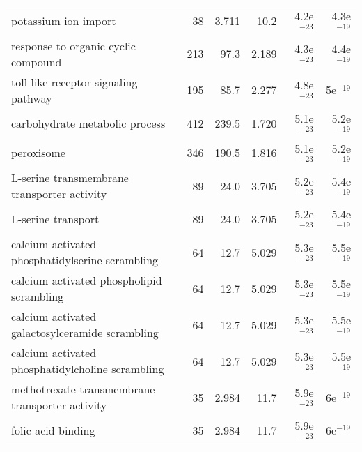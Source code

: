 \begin{longtable}{lrrrrr}
                              potassium ion import &                      38 &                   3.711 &       10.2 &         4.2e$^{-23}$ &         4.3e$^{-19}$ \\
               response to organic cyclic compound &                     213 &                    97.3 &      2.189 &         4.3e$^{-23}$ &         4.4e$^{-19}$ \\
              toll-like receptor signaling pathway &                     195 &                    85.7 &      2.277 &         4.8e$^{-23}$ &           5e$^{-19}$ \\
                    carbohydrate metabolic process &                     412 &                   239.5 &      1.720 &         5.1e$^{-23}$ &         5.2e$^{-19}$ \\
                                        peroxisome &                     346 &                   190.5 &      1.816 &         5.1e$^{-23}$ &         5.2e$^{-19}$ \\
       L-serine transmembrane transporter activity &                      89 &                    24.0 &      3.705 &         5.2e$^{-23}$ &         5.4e$^{-19}$ \\
                                L-serine transport &                      89 &                    24.0 &      3.705 &         5.2e$^{-23}$ &         5.4e$^{-19}$ \\
   calcium activated phosphatidylserine scrambling &                      64 &                    12.7 &      5.029 &         5.3e$^{-23}$ &         5.5e$^{-19}$ \\
         calcium activated phospholipid scrambling &                      64 &                    12.7 &      5.029 &         5.3e$^{-23}$ &         5.5e$^{-19}$ \\
   calcium activated galactosylceramide scrambling &                      64 &                    12.7 &      5.029 &         5.3e$^{-23}$ &         5.5e$^{-19}$ \\
  calcium activated phosphatidylcholine scrambling &                      64 &                    12.7 &      5.029 &         5.3e$^{-23}$ &         5.5e$^{-19}$ \\
   methotrexate transmembrane transporter activity &                      35 &                   2.984 &       11.7 &         5.9e$^{-23}$ &           6e$^{-19}$ \\
                                folic acid binding &                      35 &                   2.984 &       11.7 &         5.9e$^{-23}$ &           6e$^{-19}$ \\

\end{longtable}
